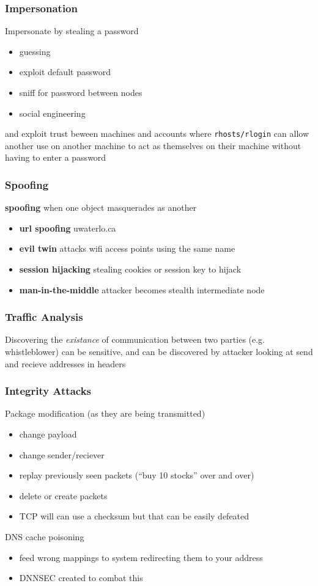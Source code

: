 \documentclass[]{article}
\theoremstyle{definition}
\begin{document}
	\subsubsection{Impersonation}
	Impersonate by stealing a password
	\begin{itemize}
		\item guessing
		\item exploit default password
		\item sniff for password between nodes
		\item social engineering
	\end{itemize}
	and exploit trust beween machines and accounts where \lstinline|rhosts/rlogin| can allow another use on another machine to act as themselves on their machine without having to enter a password

	\subsubsection{Spoofing}
	\textbf{spoofing} when one object masquerades as another
	\begin{itemize}
		\item \textbf{url spoofing} uwaterlo.ca
		\item \textbf{evil twin} attacks wifi access points using the same name
		\item \textbf{session hijacking} stealing cookies or session key to hijack
		\item \textbf{man-in-the-middle} attacker becomes stealth intermediate node
	\end{itemize}

	\subsubsection{Traffic Analysis}
	Discovering the \textit{existance} of communication between two parties (e.g. whistleblower) can be sensitive, and can be discovered by attacker looking at send and recieve addresses in headers

	\subsubsection{Integrity Attacks}
	Package modification (as they are being transmitted)
	\begin{itemize}
		\item change payload
		\item change sender/reciever
		\item replay previously seen packets (``buy 10 stocks'' over and over)
		\item delete or create packets
		\item TCP will can use a checksum but that can be easily defeated
	\end{itemize}
	DNS cache poisoning
	\begin{itemize}
		\item feed wrong mappings to system redirecting them to your address
		\item DNNSEC created to combat this
	\end{itemize}
\end{document}
